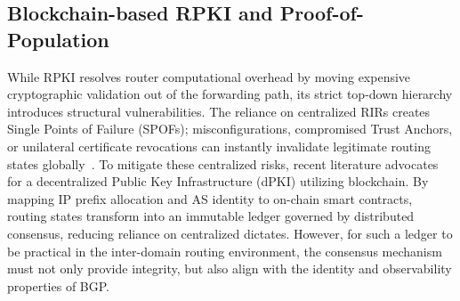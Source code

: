 \documentclass[conference]{IEEEtran}
\newcommand{\yiwen}[1]{{\color{ForestGreen}#1}}
\begin{document}
\subsection{Blockchain-based RPKI and Proof-of-Population}

While RPKI resolves router computational overhead by moving expensive cryptographic validation out of the forwarding path, its strict top-down hierarchy introduces structural vulnerabilities. The reliance on centralized RIRs creates Single Points of Failure (SPOFs); misconfigurations, compromised Trust Anchors, or unilateral certificate revocations can instantly invalidate legitimate routing states globally~\cite{nro2026rpki}. To mitigate these centralized risks, recent literature advocates for a decentralized Public Key Infrastructure (dPKI) utilizing blockchain. By mapping IP prefix allocation and AS identity to on-chain smart contracts, routing states transform into an immutable ledger governed by distributed consensus, reducing reliance on centralized dictates. However, for such a ledger to be practical in the inter-domain routing environment, the consensus mechanism must not only provide integrity, but also align with the identity and observability properties of BGP.
\end{document}
